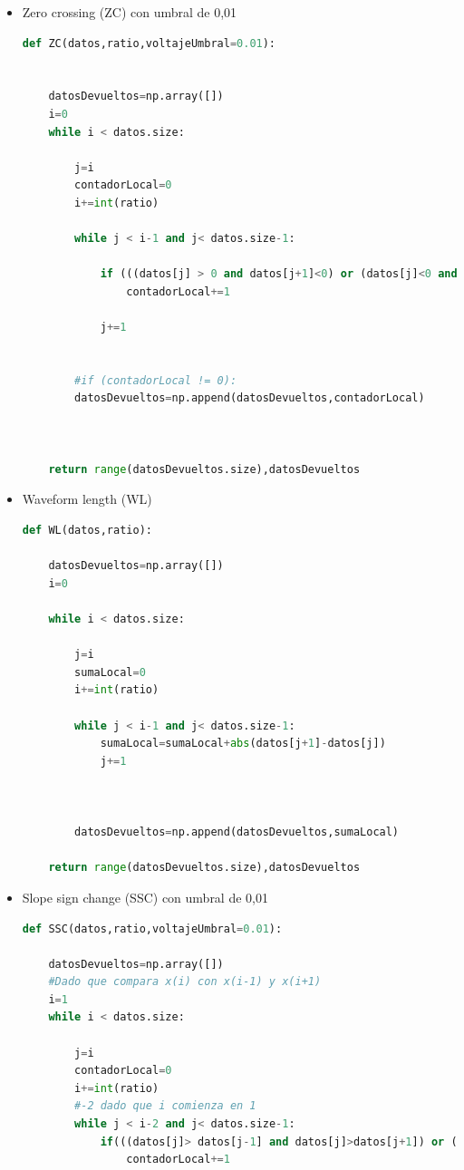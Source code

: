\begin{itemize}
\item Zero crossing (ZC) con umbral de 0,01
\begin{lstlisting}[language=Python]
def ZC(datos,ratio,voltajeUmbral=0.01):
    
    
    datosDevueltos=np.array([])
    i=0
    while i < datos.size:
 
        j=i
        contadorLocal=0
        i+=int(ratio)
        
        while j < i-1 and j< datos.size-1:
        
            if (((datos[j] > 0 and datos[j+1]<0) or (datos[j]<0 and datos[j+1]>0)) and (abs(datos[j]-datos[j+1])>= voltajeUmbral)):
                contadorLocal+=1
                
            j+=1
        
        
        #if (contadorLocal != 0):
        datosDevueltos=np.append(datosDevueltos,contadorLocal)
          
        
        
    return range(datosDevueltos.size),datosDevueltos
\end{lstlisting}

\newpage
\item Waveform length (WL)
\begin{lstlisting}[language=Python]
def WL(datos,ratio):
    
    datosDevueltos=np.array([])
    i=0
    
    while i < datos.size:
        
        j=i
        sumaLocal=0
        i+=int(ratio)
        
        while j < i-1 and j< datos.size-1:
            sumaLocal=sumaLocal+abs(datos[j+1]-datos[j])
            j+=1
            
            
            
        datosDevueltos=np.append(datosDevueltos,sumaLocal)
    
    return range(datosDevueltos.size),datosDevueltos
\end{lstlisting}

\item Slope sign change (SSC) con umbral de 0,01
\begin{lstlisting}[language=Python]
def SSC(datos,ratio,voltajeUmbral=0.01):
    
    datosDevueltos=np.array([])
    #Dado que compara x(i) con x(i-1) y x(i+1)
    i=1
    while i < datos.size:
 
        j=i
        contadorLocal=0
        i+=int(ratio)
        #-2 dado que i comienza en 1
        while j < i-2 and j< datos.size-1:
            if(((datos[j]> datos[j-1] and datos[j]>datos[j+1]) or (datos[j] < datos[j-1] and datos[j]<datos[j+1] )) and (abs(datos[j]-datos[j+1])>= voltajeUmbral or abs(datos[j]-datos[j-1])>=voltajeUmbral)):
                contadorLocal+=1
                

\end{lstlisting}
\end{itemize}
